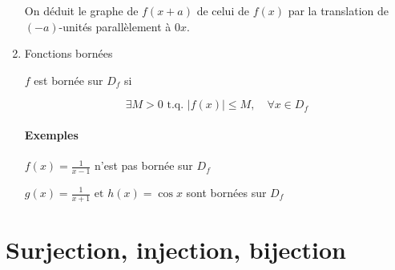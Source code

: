 \documentclass[
    11pt,
    a4paper,
    oneside,
    headinlcude, footinclude,
    twoside,
]{report}
\newcommand{\tq}[0]{\textrm{ t.q. }}
\begin{document}
\begin{enumerate}
On déduit le graphe de $f(x+a)$ de celui de $f(x)$ par la translation
de $(-a)$-unités parallèlement à $0x$.

\item Fonctions bornées

$f$ est bornée sur $D_{f}$ si 

$$\exists M > 0 \tq |f(x)| \leq M, \quad \forall x \in D_{f}$$

\paragraph{Exemples}
        

\begin{center}
$f(x) = \frac{1}{x-1}$ n'est pas bornée sur $D_{f}$

$g(x) = \frac{1}{x+1} \text{ et } h(x) = \cos x $ sont bornées sur $D_{f}$
\end{center}
\end{enumerate}


\section{Surjection, injection, bijection}
\label{sec:surjection_injection_bijection}
\end{document}
